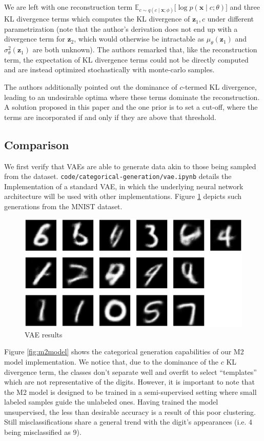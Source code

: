 We are left with one reconstruction term $\mathbb{E}_{c \sim q(c \mid \mathbf{x}; \phi)}\bigl[\log p(\mathbf{x} \mid c; \theta)\bigr]$ and three KL divergence terms which computes the KL divergence of $\mathbf{z}_1,c$ under different parametrization (note that the author's derivation does not end up with a divergence term for $\mathbf{z}_2$, which would otherwise be intractable as $\mu_\theta(\mathbf{z}_1)$ and $\sigma^2_\theta(\mathbf{z}_1)$ are both unknown). The authors remarked that, like the reconstruction term, the expectation of KL divergence terms could not be directly computed and are instead optimized stochastically with monte-carlo samples.

The authors additionally pointed out the dominance of $c$-termed KL divergence, leading to an undesirable optima where these terms dominate the reconstruction. A solution proposed in this paper and the one prior is to set a cut-off, where the terms are incorporated if and only if they are above that threshold.

\subsection{Comparison}

We first verify that VAEs are able to generate data akin to those being sampled from the dataset. \texttt{code/categorical-generation/vae.ipynb} details the Implementation of a standard VAE, in which the underlying neural network architecture will be used with other implementations. Figure \ref{fig:vae} depicts such generations from the MNIST dataset.

\begin{figure}[h]
    \centering
    \includegraphics[width=0.6\linewidth]{figures/vae-gt.png}
    \caption{VAE results}
    \label{fig:vae}
\end{figure}

Figure \ref{fig:m2model} shows the categorical generation capabilities of our M2 model implementation. We notice that, due to the dominance of the $c$ KL divergence term, the classes don't separate well and overfit to select ``templates'' which are not representative of the digits. However, it is important to note that the M2 model is designed to be trained in a semi-supervised setting where small labeled samples guide the unlabeled ones. Having trained the model unsupervised, the less than desirable accuracy is a result of this poor clustering. Still misclassifications share a general trend with the digit's appearances (i.e. 4 being misclassified as 9).

